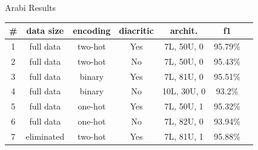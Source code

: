 \documentclass[10pt]{beamer}
\begin{document}
\begin{frame}[fragile]{Arabi Results}
\begin{center}
 \begin{tabular}{c c c c c c c}
     \toprule
     \small{\#                    }& 
     \small{data size    }& 
     \small{encoding     }&
     \small{diacritic    }&
     \small{archit.      }&
     \small{f1           }     \\
     \midrule


   \small{1} & \small{full data} & \small{two-hot} & \small{Yes} & \small{7L, 50U, 0} &\small{95.79\%}\\ 
   \small{2} & \small{full data} & \small{two-hot} & \small{No} & \small{7L, 50U, 0} & \small{95.43\%}\\ 
   \small{3} & \small{full data} & \small{binary} & \small{Yes} & \small{7L, 81U, 0} & \small{95.51\%}\\ 
   \small{4} & \small{full data} & \small{binary} & \small{No} & \small{10L, 30U, 0} & \small{93.2\%}\\ 
   \small{5} & \small{full data} & \small{one-hot} & \small{Yes} & \small{7L, 50U, 1} & \small{95.32\%}\\ 
   \small{6} & \small{full data} & \small{one-hot} & \small{No}  &\small{7L, 82U, 0} & \small{93.94\%}\\ 
   \small{7} & \small{eliminated} & \small{two-hot} & \small{Yes} & \small{7L, 81U, 1} & \small{95.88\%}\\

\end{tabular}
\end{center}
\end{frame}
\end{document}
